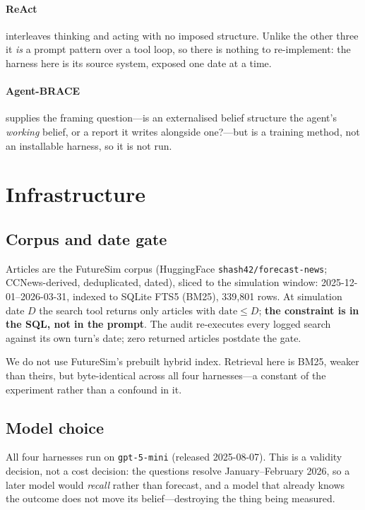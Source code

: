 \documentclass[10pt]{article}
\begin{document}
\paragraph{ReAct~\cite{react}} interleaves thinking and acting with no imposed structure. Unlike the
other three it \emph{is} a prompt pattern over a tool loop, so there is nothing to re-implement: the
harness here is its source system, exposed one date at a time.

\paragraph{Agent-BRACE~\cite{agentbrace}} supplies the framing question---is an externalised belief
structure the agent's \emph{working} belief, or a report it writes alongside one?---but is a
training method, not an installable harness, so it is not run.

\section{Infrastructure}\label{sec:infra}
\subsection{Corpus and date gate}
Articles are the FutureSim corpus (HuggingFace \texttt{shash42/forecast-news}; CCNews-derived,
deduplicated, dated), sliced to the simulation window: 2025-12-01--2026-03-31, indexed to SQLite
FTS5 (BM25), 339{,}801 rows. At simulation date $D$ the search tool returns only articles with
$\text{date}\le D$; \textbf{the constraint is in the SQL, not in the prompt}. The audit re-executes
every logged search against its own turn's date; zero returned articles postdate the gate.

We do not use FutureSim's prebuilt hybrid index. Retrieval here is BM25, weaker than theirs, but
byte-identical across all four harnesses---a constant of the experiment rather than a confound in
it.

\subsection{Model choice}
All four harnesses run on \texttt{gpt-5-mini} (released 2025-08-07). This is a validity decision,
not a cost decision: the questions resolve January--February 2026, so a later model would
\emph{recall} rather than forecast, and a model that already knows the outcome does not move its
belief---destroying the thing being measured.
\end{document}
